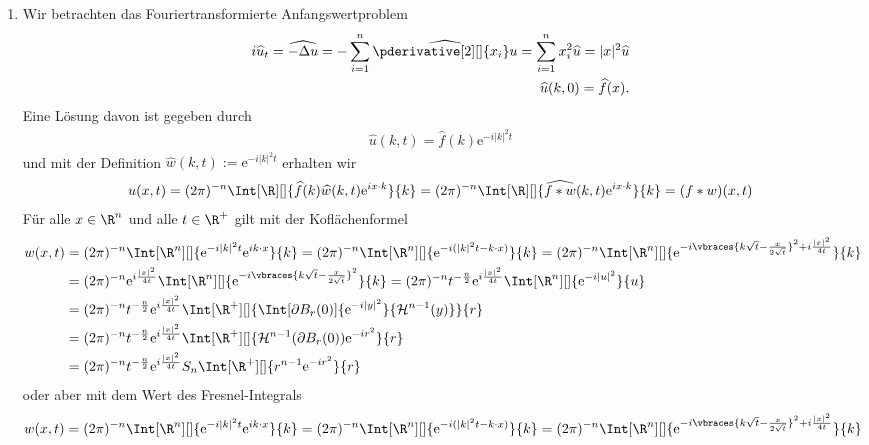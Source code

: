 \begin{solution}
	\phantom{}
	\begin{enumerate}[label = (\roman*)]
		\item Wir betrachten das Fouriertransformierte Anfangswertproblem
			\begin{align*}
			i \widehat{u}_t = \widehat{- \Delta u} = - \sum_{i = 1}^n \widehat{\pderivative[2][]{x_i}u} = \sum_{i = 1}^n x_i^2 \widehat{u} = |x|^2 \widehat{u} \\
			\widehat{u}(k,0) = \widehat{f}(x).
			\end{align*}
			Eine Lösung davon ist gegeben durch
			\begin{align*}
			\widehat{u}(k,t) = \widehat{f}(k) \mathrm{e}^{-i|k|^2t}
			\end{align*}
			und mit der Definition $\widehat{w}(k,t) := \mathrm{e}^{-i|k|^2t}$ erhalten wir
			\begin{align*}
			u(x,t) = (2\pi)^{-n} \Int[\R][]{\widehat{f}(k) \widehat{w}(k,t) \mathrm{e}^{i x \cdot k}}{k} = (2\pi)^{-n} \Int[\R][]{\widehat{f \ast w}(k, t) \mathrm{e}^{i x \cdot k}}{k} = (f \ast w)(x,t)
			\end{align*}
			Für alle $x \in \R^n$ und alle $t \in \R^+$ gilt mit der Koflächenformel 
			\begin{align*}
			w(x,t) &= (2 \pi)^{-n} \Int[\R^n][]{\mathrm{e}^{- i |k|^2 t} \mathrm{e}^{i k \cdot x}}{k} = (2 \pi)^{-n} \Int[\R^n][]{\mathrm{e}^{- i (|k|^2 t - k \cdot x)}}{k} = (2 \pi)^{-n} \Int[\R^n][]{\mathrm{e}^{- i \vbraces{k \sqrt{t} - \frac{x}{2 \sqrt{t}}}^2 + i\frac{|x|^2}{4t}}}{k} \\
			&= (2 \pi)^{-n} \mathrm{e}^{i\frac{|x|^2}{4t}} \Int[\R^n][]{\mathrm{e}^{- i \vbraces{k \sqrt{t} - \frac{x}{2 \sqrt{t}}}^2}}{k} = (2 \pi)^{-n} t^{-\frac{n}{2}} \mathrm{e}^{i\frac{|x|^2}{4t}} \Int[\R^n][]{\mathrm{e}^{- i|u|^2}}{u} \\
			&= (2 \pi)^{-n} t^{-\frac{n}{2}} \mathrm{e}^{i\frac{|x|^2}{4t}} \Int[\R^+][]{\Int[\partial B_r(0)]{\mathrm{e}^{- i|y|^2}}{\mathcal{H}^{n - 1}(y)}}{r} \\
			&= (2 \pi)^{-n} t^{-\frac{n}{2}} \mathrm{e}^{i\frac{|x|^2}{4t}}  \Int[\R^+][]{\mathcal{H}^{n - 1}(\partial B_r(0))\mathrm{e}^{- ir^2}}{r} \\
			&= (2 \pi)^{-n} t^{-\frac{n}{2}} \mathrm{e}^{i\frac{|x|^2}{4t}} S_n  \Int[\R^+][]{r^{n - 1}\mathrm{e}^{- ir^2}}{r}
			\end{align*}
			oder aber mit dem Wert des Fresnel-Integrals
			\begin{align*}
			w(x,t) &= (2 \pi)^{-n} \Int[\R^n][]{\mathrm{e}^{- i |k|^2 t} \mathrm{e}^{i k \cdot x}}{k} = (2 \pi)^{-n} \Int[\R^n][]{\mathrm{e}^{- i (|k|^2 t - k \cdot x)}}{k} = (2 \pi)^{-n} \Int[\R^n][]{\mathrm{e}^{- i \vbraces{k \sqrt{t} - \frac{x}{2 \sqrt{t}}}^2 + i\frac{|x|^2}{4t}}}{k} \\

\end{align*}
\end{enumerate}
\end{solution}
